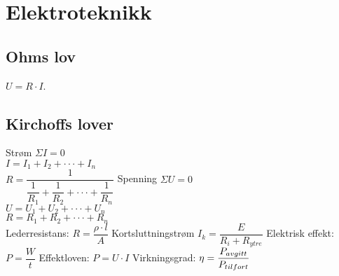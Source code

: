 \section{Elektroteknikk}
\vskip 2.5pt
\subsection*{Ohms lov}
\vskip 2.5pt
$U=R\cdot I$.
\vskip 2.5pt
\subsection*{Kirchoffs lover}
\vskip 2.5pt  
Strøm $\Sigma I=0$\\
\vskip 2.5pt  
$I=I_{1}+I_{2}+\cdot\cdot\cdot+I_{n}$\\
\vskip 2.5pt  
$R=\dfrac{1}{\dfrac{1}{R_{1}}+\dfrac{1}{R_{2}}+\cdot\cdot\cdot+\dfrac{1}{R_{n}}}$ 
\vskip 2pt
 Spenning $\Sigma U=0$\\
\vskip 2.5pt  
$U=U_{1}+U_{2}+\cdot\cdot\cdot+U_{n}$\\
\vskip 2.5pt  
$R=R_{1}+R_{2}+\cdot\cdot\cdot+R_{n}$\\
\vskip 2pt
Lederresistans: $ R=\dfrac{\rho\cdot l}{A}$ 
\vskip 2pt
Kortsluttningstrøm $I_{k}=\dfrac{E}{R_{i}+R_{ytre}}$
\vskip 2pt
Elektrisk effekt: $P=\dfrac{W}{t}$
\vskip 2pt  
Effektloven: $P=U\cdot I$
\vskip 2.5pt  
Virkningsgrad: $\eta=\dfrac{P_{avgitt}}{P_{tilf\\ort}}$
\vskip 2.5pt \ 
